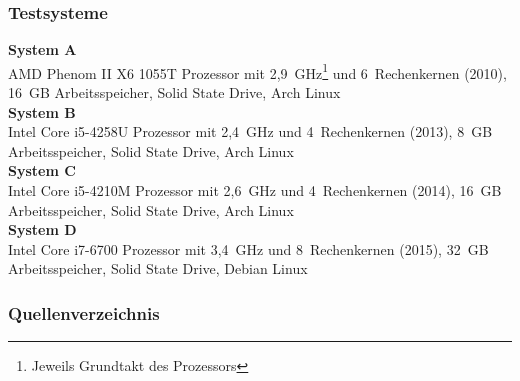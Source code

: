     \begin{frame}[noframenumbering]
      \frametitle{Testsysteme}
      {
        \footnotesize
        \textbf{System A}\\
          AMD Phenom II X6 1055T Prozessor mit 2,9~GHz\footnote{Jeweils Grundtakt des Prozessors} und 6~Rechenkernen (2010), 16~GB Arbeitsspeicher, Solid State Drive, Arch Linux\\[1em]
        \textbf{System B}\\
          Intel Core i5-4258U Prozessor mit 2,4~GHz und 4~Rechenkernen (2013), 8~GB Arbeitsspeicher, Solid State Drive, Arch Linux\\[1em]
        \textbf{System C}\\
          Intel Core i5-4210M Prozessor mit 2,6~GHz und 4~Rechenkernen (2014), 16~GB Arbeitsspeicher, Solid State Drive, Arch Linux\\[1em]
        \textbf{System D}\\
          Intel Core i7-6700 Prozessor mit 3,4~GHz und 8~Rechenkernen (2015), 32~GB Arbeitsspeicher, Solid State Drive, Debian Linux
      }
    \end{frame}

    \begin{frame}
      \frametitle{Quellenverzeichnis}
      \printbibliography
    \end{frame}

